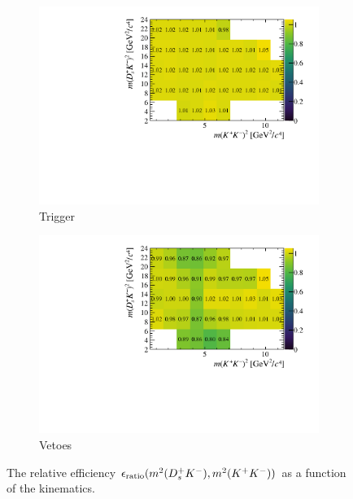 \begin{figure}[!h]
   \centering
   \begin{subfigure}[t]{0.45\textwidth}
      \includegraphics[width=1.0\textwidth]{figs/B2DsKK/Relative_Eff_trig_All.pdf}
      \caption{Trigger}
      \label{fig:B2DsKK_releff_trigger}
   \end{subfigure}
   \begin{subfigure}[t]{0.45\textwidth}
      \includegraphics[width=1.0\textwidth]{figs/B2DsKK/Relative_Eff_veto_All.pdf}
      \caption{Vetoes}
      \label{fig:B2DsKK_releff_vetoes}
   \end{subfigure}
   \caption{The relative efficiency $\epsilon_{\text{ratio}}(m^{2}({{D}^+_{s}}{{K}^-}),m^{2}({{K}^+}{{K}^-}))$ as a function of the \decay{\Bp}{\Dsp\Kp\Km} kinematics.}
   \label{fig:B2DsKK_dalitz_eff_one}
\end{figure}

